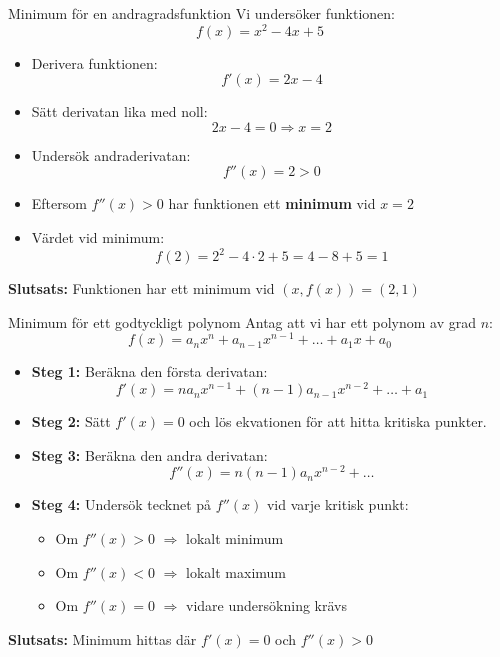\documentclass[10pt,english]{beamer}
\begin{document}
\begin{frame}{Minimum för en andragradsfunktion}
    Vi undersöker funktionen:
    \[
    f(x) = x^2 - 4x + 5
    \]
    \begin{itemize}
        \item Derivera funktionen:
        \[
        f'(x) = 2x - 4
        \]
        \item Sätt derivatan lika med noll:
        \[
        2x - 4 = 0 \Rightarrow x = 2
        \]
        \item Undersök andraderivatan:
        \[
        f''(x) = 2 > 0
        \]
        \item Eftersom $f''(x) > 0$ har funktionen ett \textbf{minimum} vid $x = 2$
        \item Värdet vid minimum:
        \[
        f(2) = 2^2 - 4 \cdot 2 + 5 = 4 - 8 + 5 = 1
        \]
    \end{itemize}
    \textbf{Slutsats:} Funktionen har ett minimum vid $(x, f(x)) = (2, 1)$
\end{frame}


\begin{frame}{Minimum för ett godtyckligt polynom}
    Antag att vi har ett polynom av grad $n$:
    \[
    f(x) = a_n x^n + a_{n-1} x^{n-1} + \dots + a_1 x + a_0
    \]
    \begin{itemize}
        \item \textbf{Steg 1:} Beräkna den första derivatan:
        \[
        f'(x) = n a_n x^{n-1} + (n-1) a_{n-1} x^{n-2} + \dots + a_1
        \]
        \item \textbf{Steg 2:} Sätt $f'(x) = 0$ och lös ekvationen för att hitta kritiska punkter.
        \item \textbf{Steg 3:} Beräkna den andra derivatan:
        \[
        f''(x) = n(n-1) a_n x^{n-2} + \dots
        \]
        \item \textbf{Steg 4:} Undersök tecknet på $f''(x)$ vid varje kritisk punkt:
        \begin{itemize}
            \item Om $f''(x) > 0$ $\Rightarrow$ lokalt minimum
            \item Om $f''(x) < 0$ $\Rightarrow$ lokalt maximum
            \item Om $f''(x) = 0$ $\Rightarrow$ vidare undersökning krävs
        \end{itemize}
    \end{itemize}
    \textbf{Slutsats:} Minimum hittas där $f'(x) = 0$ och $f''(x) > 0$
\end{frame}
\end{document}
